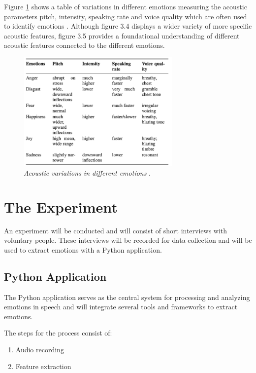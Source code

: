  Figure \ref{fig:acoustic-variations} shows a table of variations in different emotions measuring the acoustic parameters pitch, intensity, speaking rate and voice quality which are often used to identify emotions \autocite{Khalil2019}. Although figure 3.4 displays a wider variety of more specific acoustic features, figure 3.5 provides a foundational understanding of different acoustic features connected to the different emotions.

\begin{figure}[h]
    \centering
    \includegraphics[width=8cm]{png/Figure8-AcousticVariations.png}
    \caption{\textit{Acoustic variations in different emotions} \autocite{Khalil2019}.}
    \label{fig:acoustic-variations}
\end{figure}

\section{The Experiment}

An experiment will be conducted and will consist of short interviews with voluntary people. These interviews will be recorded for data collection and will be used to extract emotions with a Python application. 

\subsection{Python Application}

The Python application serves as the central system for processing and analyzing emotions in speech and will integrate several tools and frameworks to extract emotions.

The steps for the process consist of:

\begin{enumerate}
    \item Audio recording
    \item Feature extraction
\end{enumerate}

